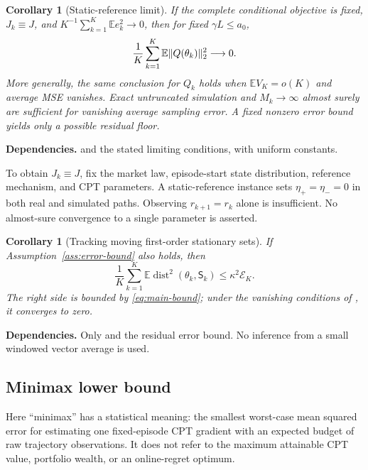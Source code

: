 \documentclass[11pt]{article}
\newtheorem{corollary}[theorem]{Corollary}
\newcommand{\E}{\mathbb E}
\newcommand{\1}{\mathbf 1}
\newcommand{\dist}{\operatorname{dist}}
\DeclarePairedDelimiter{\norm}{\lVert}{\rVert}
\newcommand{\Sta}{\mathsf S}
\theoremstyle{definition}
\newcommand{\dependson}[1]{\par\noindent\textbf{Dependencies.} #1\par\smallskip}
\begin{document}
\begin{corollary}[Static-reference limit]\label{cor:static}
If the complete conditional objective is fixed, $J_k\equiv J$, and
$K^{-1}\sum_{k=1}^K\E e_k^2\to0$, then for fixed $\gamma L\le a_0$,
\begin{equation}\label{eq:static-corollary}
 \frac1K\sum_{k=1}^K\E\norm{Q(\theta_k)}_2^2\longrightarrow0.
\end{equation}
More generally, the same conclusion for $Q_k$ holds when $\E V_K=o(K)$ and average MSE vanishes. Exact untruncated simulation and $M_k\to\infty$ almost surely are sufficient for vanishing average sampling error. A fixed nonzero error bound yields only a possible residual floor.
\end{corollary}
\dependson{ and the stated limiting conditions, with uniform constants.}
To obtain $J_k\equiv J$, fix the market law, episode-start state distribution, reference mechanism, and CPT parameters. A static-reference instance sets $\eta_+=\eta_-=0$ in both real and simulated paths. Observing $r_{k+1}=r_k$ alone is insufficient. No almost-sure convergence to a single parameter is asserted.

\begin{corollary}[Tracking moving first-order stationary sets]\label{cor:set-tracking}
If Assumption~\ref{ass:error-bound} also holds, then
\begin{equation}\label{eq:set-tracking}
 \frac1K\sum_{k=1}^K\E\dist^2(\theta_k,\Sta_k)
 \le\kappa^2\mathcal E_K.
\end{equation}
The right side is bounded by \eqref{eq:main-bound}; under the vanishing conditions of , it converges to zero.
\end{corollary}
\dependson{Only  and the residual error bound. No inference from a small windowed vector average is used.}

\subsection{Minimax lower bound}
Here ``minimax'' has a statistical meaning: the smallest worst-case mean squared error for estimating one fixed-episode CPT gradient with an expected budget of raw trajectory observations. It does not refer to the maximum attainable CPT value, portfolio wealth, or an online-regret optimum.
\end{document}
